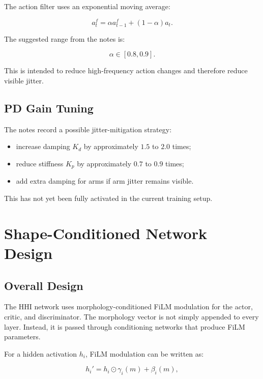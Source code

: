 \documentclass[11pt,a4paper]{article}
\begin{document}
The action filter uses an exponential moving average:

\begin{equation}
    a_t^f = \alpha a_{t-1}^f + (1-\alpha)a_t.
\end{equation}

The suggested range from the notes is:

\begin{equation}
    \alpha \in [0.8, 0.9].
\end{equation}

This is intended to reduce high-frequency action changes and therefore reduce visible jitter.

\subsection{PD Gain Tuning}

The notes record a possible jitter-mitigation strategy:

\begin{itemize}[leftmargin=2em]
    \item increase damping $K_d$ by approximately $1.5$ to $2.0$ times;
    \item reduce stiffness $K_p$ by approximately $0.7$ to $0.9$ times;
    \item add extra damping for arms if arm jitter remains visible.
\end{itemize}

This has not yet been fully activated in the current training setup.

\section{Shape-Conditioned Network Design}

\subsection{Overall Design}

The HHI network uses morphology-conditioned FiLM modulation for the actor, critic, and discriminator. The morphology vector is not simply appended to every layer. Instead, it is passed through conditioning networks that produce FiLM parameters.

For a hidden activation $h_i$, FiLM modulation can be written as:

\begin{equation}
    h_i' = h_i \odot \gamma_i(m) + \beta_i(m),
\end{equation}
\end{document}
